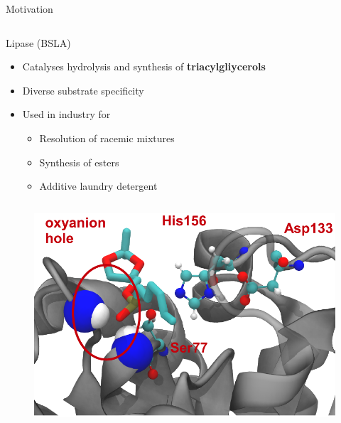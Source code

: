 \documentclass{beamer}
\begin{document}
\begin{frame}[t]
\begin{columns}[T,onlytextwidth]
\begin{column}[T]{.48\linewidth}
{\begin{block}{Motivation}
\begin{columns}[t]
            \end{columns}  

        \end{block}


        \vspace*{1.0ex}

        \vfill 

        \begin{block}{Lipase (BSLA)}

            \begin{center}
            \begin{minipage}{0.8\linewidth}%
                \begin{itemize}
                    \item Catalyses hydrolysis and synthesis of \textbf{triacylgliycerols}
                    \item Diverse substrate specificity
                    \item Used in industry for
                        \begin{itemize}
                            \item Resolution of racemic mixtures
                            \item Synthesis of esters
                            \item Additive laundry detergent
                        \end{itemize}
                \end{itemize}  
            \end{minipage}
            \end{center}   


            \begin{columns}[t]
                \begin{figure}
                    \includegraphics[width=1.0\textwidth]{figures/BSLA_pocket/BSLA_pocket_cartoon.pdf}
                \end{figure}      


\end{columns}
\end{block}}
\end{column}
\end{columns}
\end{frame}
\end{document}

